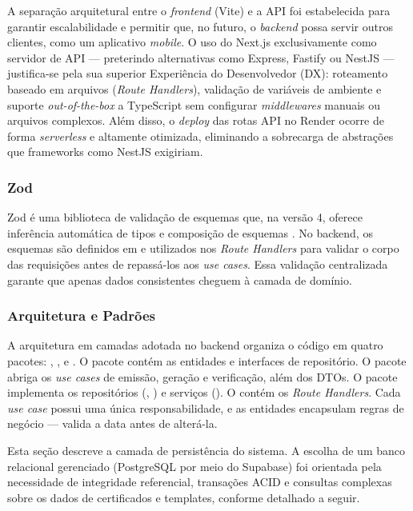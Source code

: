A separação arquitetural entre o \textit{frontend} (Vite) e a API foi estabelecida para garantir escalabilidade e permitir que, no futuro, o \textit{backend} possa servir outros clientes, como um aplicativo \textit{mobile}. O uso do Next.js exclusivamente como servidor de API --- preterindo alternativas como Express, Fastify ou NestJS --- justifica-se pela sua superior Experiência do Desenvolvedor (DX): roteamento baseado em arquivos (\textit{Route Handlers}), validação de variáveis de ambiente e suporte \textit{out-of-the-box} a TypeScript sem configurar \textit{middlewares} manuais ou arquivos  complexos. Além disso, o \textit{deploy} das rotas API no Render ocorre de forma \textit{serverless} e altamente otimizada, eliminando a sobrecarga de abstrações que frameworks como NestJS exigiriam.

\subsubsection{Zod}
Zod é uma biblioteca de validação de esquemas que, na versão 4, oferece inferência automática de tipos e composição de esquemas \cite{zod2025}. No backend, os esquemas são definidos em  e utilizados nos \textit{Route Handlers} para validar o corpo das requisições antes de repassá-los aos \textit{use cases}. Essa validação centralizada garante que apenas dados consistentes cheguem à camada de domínio.

\subsubsection{Arquitetura e Padrões}
A arquitetura em camadas adotada no backend organiza o código em quatro pacotes: , ,  e . O pacote  contém as entidades e interfaces de repositório. O pacote  abriga os \textit{use cases} de emissão, geração e verificação, além dos DTOs. O pacote  implementa os repositórios (, ) e serviços (). O  contém os \textit{Route Handlers}. Cada \textit{use case} possui uma única responsabilidade, e as entidades encapsulam regras de negócio ---  valida a data antes de alterá-la.


Esta seção descreve a camada de persistência do sistema. A escolha de um banco relacional gerenciado (PostgreSQL por meio do Supabase) foi orientada pela necessidade de integridade referencial, transações ACID e consultas complexas sobre os dados de certificados e templates, conforme detalhado a seguir.

